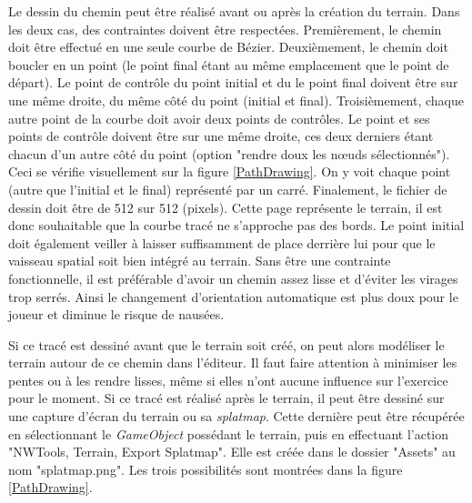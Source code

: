 		Le dessin du chemin peut être réalisé avant ou après la création du terrain. Dans les deux cas, des contraintes doivent être respectées. Premièrement, le chemin doit être effectué en une seule courbe de Bézier. Deuxièmement, le chemin doit boucler en un point (le point final étant au même emplacement que le point de départ). Le point de contrôle du point initial et du le point final doivent être sur une même droite, du même côté du point (initial et final). Troisièmement, chaque autre point de la courbe doit avoir deux points de contrôles. Le point et ses points de contrôle doivent être sur une même droite, ces deux derniers étant chacun d'un autre côté du point (option "rendre doux les nœuds sélectionnés"). Ceci se vérifie visuellement sur la figure \ref{PathDrawing}. On y voit chaque point (autre que l'initial et le final) représenté par un carré. Finalement, le fichier de dessin doit être de 512 sur 512 (pixels). Cette page représente le terrain, il est donc souhaitable que la courbe tracé ne s'approche pas des bords. Le point initial doit également veiller à laisser suffisamment de place derrière lui pour que le vaisseau spatial soit bien intégré au terrain. Sans être une contrainte fonctionnelle, il est préférable d'avoir un chemin assez lisse et d'éviter les virages trop serrés. Ainsi le changement d'orientation automatique est plus doux pour le joueur et diminue le risque de nausées.%
		\medskip
		
		\begin{minipage}{\linewidth}
			\label{PathDrawing}
		\end{minipage}\medskip
		
		Si ce tracé est dessiné avant que le terrain soit créé, on peut alors modéliser le terrain autour de ce chemin dans l'éditeur. Il faut faire attention à minimiser les pentes ou à les rendre lisses, même si elles n'ont aucune influence sur l'exercice pour le moment. Si ce tracé est réalisé après le terrain, il peut être dessiné sur une capture d'écran du terrain ou sa \textit{splatmap}. Cette dernière peut être récupérée en sélectionnant le \textit{GameObject} possédant le terrain, puis en effectuant l'action "NWTools, Terrain, Export Splatmap". Elle est créée dans le dossier "Assets" au nom "splatmap.png". Les trois possibilités sont montrées dans la figure \ref{PathDrawing}.
		\\
		
